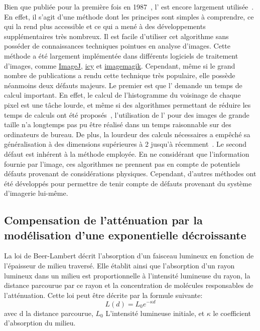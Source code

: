 \documentclass[\main/main.tex]{subfiles}
\begin{document}
%
Bien que publiée pour la première fois en 1987~\cite{pizer_1987},
l'\clahe{} est encore largement utilisée~\cite{dabass_2019,sonali_2018,lv_2019}.
%
En effet, il s'agit d'une méthode dont les principes sont simples à comprendre, ce qui la rend plus accessible et ce qui a mené à des développements supplémentaires très nombreux. Il est facile d'utiliser cet algorithme sans posséder de connaissances techniques pointues en analyse d'images.
%
Cette méthode a été largement implémentée dans différents logiciels de traitement d'images, comme \href{https://imagej.net/Enhance_Local_Contrast_(CLAHE)}{ImageJ},
\href{http://icy.bioimageanalysis.org/plugin/adaptive-histogram-equalization/}{icy} et \href{https://imagemagick.org/script/clahe.php}{imagemagik}.
%
Cependant, même si le grand nombre  de publications a rendu cette technique très populaire, elle possède néanmoins deux défauts majeurs.
%
Le premier est que l'\clahe{} demande un temps de calcul important.
%
En effet, le calcul de l'histogramme du voisinage de chaque pixel est une tâche lourde, et même si des algorithmes permettant de réduire les temps de calculs ont été proposés~\cite{sund_2006}, l'utilisation de l'\clahe{} pour des images de grande taille n'a longtemps pas pu être réalisé dans un temps raisonnable sur des ordinateurs de bureau. De plus, la lourdeur des calculs nécessaires a empêché sa généralisation à des dimensions supérieures à 2 jusqu'à récemment~\cite{amorim_2018, stimper_2019}.
%
Le second défaut est inhérent à la méthode employée.
%
En ne considérant que l'information fournie par l'image, ces algorithmes ne prennent pas en compte de potentiels défauts provenant de considérations physiques.
%
Cependant, d'autres méthodes ont été développés pour permettre de tenir compte de défauts provenant du système d'imagerie lui-même.

\subsection{Compensation de l'atténuation par la modélisation d'une exponentielle décroissante} %

%
\label{sec:beer}
La loi de Beer-Lambert décrit l'absorption d'un faisceau lumineux en fonction de l'épaisseur de milieu traversé. Elle établit ainsi que l'absorption d'un rayon lumineux dans un milieu est proportionnelle à l'intensité lumineuse du rayon, la distance parcourue par ce rayon et la concentration de molécules responsables de l'atténuation.
%
Cette loi peut être décrite par la formule suivante:
\begin{equation}
    L(d) = L_{0}e^{-\kappa{}d}
\end{equation}
avec d la distance parcourue, $L_{0}$ L'intensité lumineuse initiale, et $\kappa{}$ le coefficient d'absorption du milieu.
\end{document}
